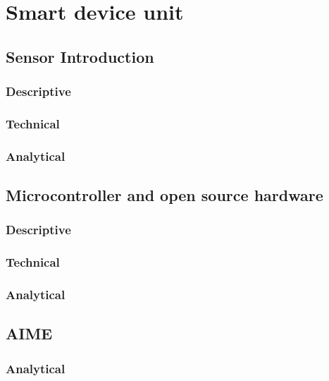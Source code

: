 \chapter{Smart device unit}
\thispagestyle{fancy}


\section{Sensor Introduction}
\subsection{Descriptive}
\subsection{Technical}
\subsection{Analytical}


\section{Microcontroller and open source hardware}
\subsection{Descriptive}
\subsection{Technical}
\subsection{Analytical}


\section{AIME}
\subsection{Analytical}